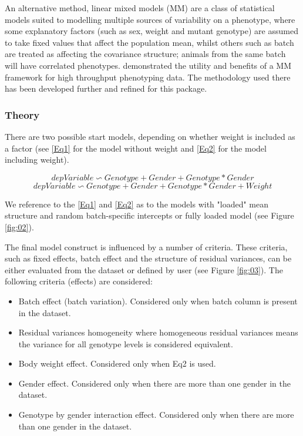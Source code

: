 \documentclass[12pt,a4paper]{article}
\begin{document}
An alternative method, linear mixed models (MM) are a class of statistical models suited to modelling multiple sources of variability on a phenotype, where some explanatory factors (such as sex, weight and mutant genotype) are assumed to take fixed values that affect the population mean, whilst others such as batch are treated as affecting the covariance structure; animals from the same batch will have correlated phenotypes. \cite{MM12} demonstrated the utility and benefits of a MM framework for high throughput phenotyping data. The methodology used there has been developed further and refined for this package. 

\subsubsection{Theory}
There are two possible start models, depending on whether weight is included as a factor (see \ref{Eq1} for the model without weight and \ref{Eq2} for the model including weight).

\[
depVariable \backsim Genotype + Gender +
Genotype*Gender \tag{Eq1}\label{Eq1}
\]
\[
depVariable \backsim Genotype + Gender +
Genotype*Gender + Weight \tag{Eq2}\label{Eq2}
\]

We reference to the \ref{Eq1} and \ref{Eq2} as to the models with "loaded" mean structure and random batch-specific intercepts or fully loaded model (see Figure \ref{fig:02}).

The final model construct is influenced by a number of criteria. 
These criteria, such as fixed effects, batch effect and the structure of residual variances, can be either evaluated from the dataset or defined by user (see Figure \ref{fig:03}).
The following criteria (effects) are considered:
\begin{itemize}
\item Batch effect (batch variation). Considered only when batch column is present in the dataset. 
\item Residual variances homogeneity where homogeneous residual variances means the variance for all genotype levels is considered equivalent.
\item Body weight effect. Considered only when Eq2 is used.
\item Gender effect. Considered only when there are more than one gender in the dataset. 
\item Genotype by gender interaction effect. Considered only when there are more than one gender in the dataset. 
\end{itemize}
\end{document}
